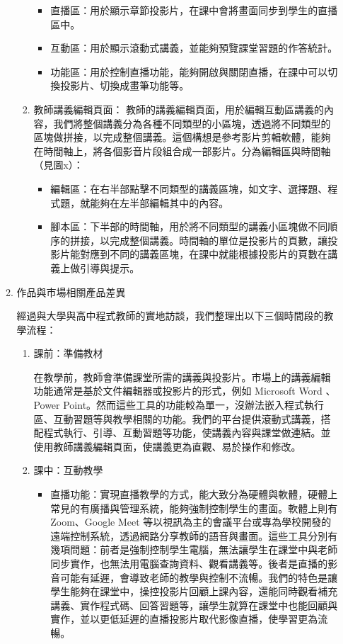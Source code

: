 \documentclass[12pt]{article}
\begin{document}
\begin{enumerate}
\begin{enumerate}
\begin{enumerate}[label=(\arabic*)]
            \begin{itemize}
              \item 直播區：用於顯示章節投影片，在課中會將畫面同步到學生的直播區中。
              \item 互動區：用於顯示滾動式講義，並能夠預覽課堂習題的作答統計。
              \item 功能區：用於控制直播功能，能夠開啟與關閉直播，在課中可以切換投影片、切換成畫筆功能等。
            \end{itemize}
          \item 教師講義編輯頁面：
          教師的講義編輯頁面，用於編輯互動區講義的內容，我們將整個講義分為各種不同類型的小區塊，透過將不同類型的區塊做拼接，以完成整個講義。這個構想是參考影片剪輯軟體，能夠在時間軸上，將各個影音片段組合成一部影片。分為編輯區與時間軸（見圖x）：
            \begin{itemize}
              \item 編輯區：在右半部點擊不同類型的講義區塊，如文字、選擇題、程式題，就能夠在左半部編輯其中的內容。
              \item 腳本區：下半部的時間軸，用於將不同類型的講義小區塊做不同順序的拼接，以完成整個講義。時間軸的單位是投影片的頁數，讓投影片能對應到不同的講義區塊，在課中就能根據投影片的頁數在講義上做引導與提示。
            \end{itemize}
        \end{enumerate}
      \item 作品與市場相關產品差異
        \par 經過與大學與高中程式教師的實地訪談，我們整理出以下三個時間段的教學流程：
        \begin{enumerate}[label=(\arabic*)]
          \setlength{\parindent}{2em}
          \item 課前：準備教材
            \par 在教學前，教師會準備課堂所需的講義與投影片。市場上的講義編輯功能通常是基於文件編輯器或投影片的形式，例如 Microsoft Word 、Power Point。然而這些工具的功能較為單一，沒辦法嵌入程式執行區、互動習題等與教學相關的功能。我們的平台提供滾動式講義，搭配程式執行、引導、互動習題等功能，使講義內容與課堂做連結。並使用教師講義編輯頁面，使講義更為直觀、易於操作和修改。
          \item 課中：互動教學
            \begin{itemize}
              \item 直播功能：實現直播教學的方式，能大致分為硬體與軟體，硬體上常見的有廣播與管理系統，能夠強制控制學生的畫面。軟體上則有 Zoom、Google Meet 等以視訊為主的會議平台或專為學校開發的遠端控制系統，透過網路分享教師的語音與畫面。這些工具分別有幾項問題：前者是強制控制學生電腦，無法讓學生在課堂中與老師同步實作，也無法用電腦查詢資料、觀看講義等。後者是直播的影音可能有延遲，會導致老師的教學與控制不流暢。我們的特色是讓學生能夠在課堂中，操控投影片回顧上課內容，還能同時觀看補充講義、實作程式碼、回答習題等，讓學生就算在課堂中也能回顧與實作，並以更低延遲的直播投影片取代影像直播，使學習更為流暢。

\end{itemize}
\end{enumerate}
\end{enumerate}
\end{enumerate}
\end{document}
